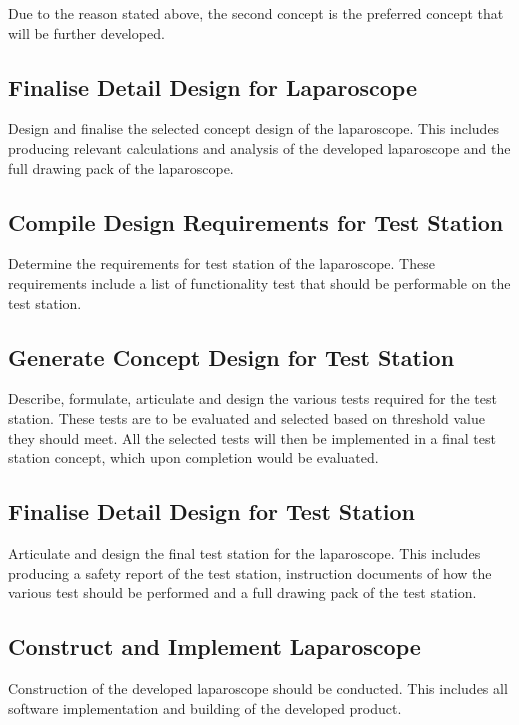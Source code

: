 Due to the reason stated above, the second concept is the preferred concept that will be further developed.

\subsection{Finalise Detail Design for Laparoscope}

Design and finalise the selected concept design of the laparoscope. This includes producing relevant calculations and analysis of the developed laparoscope and the full drawing pack of the laparoscope.

\subsection{Compile Design Requirements for Test Station}

Determine the requirements for test station of the laparoscope. These requirements include a list of functionality test that should be performable on the test station. 

\subsection{Generate Concept Design for Test Station}

Describe, formulate, articulate and design the various tests required for the test station. These tests are to be evaluated and selected based on threshold value they should meet. All the selected tests will then be implemented in a final test station concept, which upon completion would be evaluated. 

\subsection{Finalise Detail Design for Test Station}

Articulate and design the final test station for the laparoscope. This includes producing a safety report of the test station, instruction documents of how the various test should be performed and a full drawing pack of the test station.

\subsection{Construct and Implement Laparoscope}

Construction of the developed laparoscope should be conducted. This includes all software implementation and building of the developed product.

